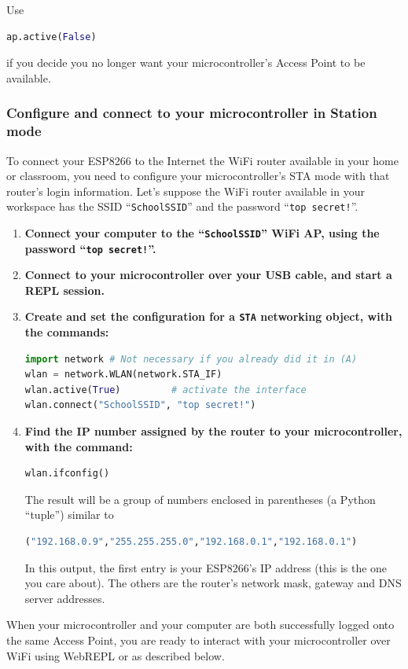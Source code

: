 Use 
\begin{lstlisting}[language=Python]
ap.active(False)
\end{lstlisting}
if you decide you no longer want your microcontroller's Access Point to be available.

\subsubsection{\howto Configure and connect to your microcontroller in Station mode}
To connect your ESP8266 to the Internet the WiFi router available in your home or classroom, you need to configure your microcontroller's STA mode with that router's login information. 
Let's suppose the WiFi router available in your workspace has the SSID ``\texttt{SchoolSSID}'' and the password ``\texttt{top secret!}''.
\begin{enumerate}
	\item \textbf{Connect your computer to the ``\texttt{SchoolSSID}'' WiFi AP, using the password ``\texttt{top secret!}''.}
	\item \textbf{Connect to your microcontroller over your USB cable, and start a REPL session.} 
	\item \textbf{Create and set the configuration for a \texttt{STA} networking object, with the commands:}
\begin{lstlisting}[language=Python]
import network # Not necessary if you already did it in (A) 
wlan = network.WLAN(network.STA_IF)
wlan.active(True)         # activate the interface
wlan.connect("SchoolSSID", "top secret!")
\end{lstlisting}
	\item \textbf{Find the IP number assigned by the router to your microcontroller, with the command:}
\begin{lstlisting}[language=Python]
wlan.ifconfig()
\end{lstlisting}
	The result will be a group of numbers enclosed in parentheses (a Python ``tuple'') similar to 
\begin{lstlisting}[language=Python]
("192.168.0.9","255.255.255.0","192.168.0.1","192.168.0.1")
\end{lstlisting}
	In this output, the first entry is your ESP8266’s IP address (this is the one you care about). 
	The others are the router’s network mask, gateway and DNS server addresses. 
\end{enumerate}
When your microcontroller and your computer are both successfully logged onto the same Access Point, you are ready to interact with your microcontroller over WiFi using WebREPL or \mpfshell as described below.

